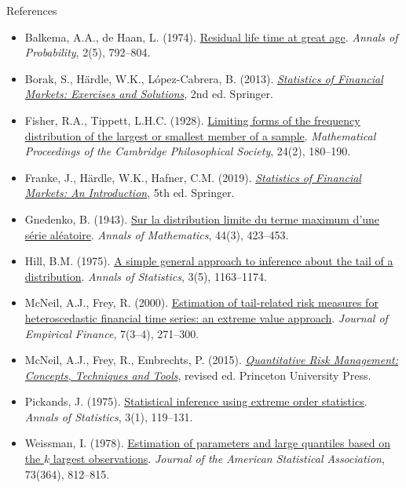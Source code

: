 \begin{frame}{References}
\itemsize{\tiny}
\begin{itemize}
    \item Balkema, A.A., de Haan, L. (1974). \href{https://doi.org/10.1214/aop/1176996548}{Residual life time at great age}. \textit{Annals of Probability}, 2(5), 792--804.
    \item Borak, S., Härdle, W.K., López-Cabrera, B. (2013). \href{https://doi.org/10.1007/978-3-642-33929-5}{\textit{Statistics of Financial Markets: Exercises and Solutions}}, 2nd ed. Springer.
    \item Fisher, R.A., Tippett, L.H.C. (1928). \href{https://doi.org/10.1017/S0305004100015681}{Limiting forms of the frequency distribution of the largest or smallest member of a sample}. \textit{Mathematical Proceedings of the Cambridge Philosophical Society}, 24(2), 180--190.
    \item Franke, J., Härdle, W.K., Hafner, C.M. (2019). \href{https://doi.org/10.1007/978-3-030-13751-9}{\textit{Statistics of Financial Markets: An Introduction}}, 5th ed. Springer.
    \item Gnedenko, B. (1943). \href{https://doi.org/10.2307/1968974}{Sur la distribution limite du terme maximum d'une série aléatoire}. \textit{Annals of Mathematics}, 44(3), 423--453.
    \item Hill, B.M. (1975). \href{https://doi.org/10.1214/aos/1176343247}{A simple general approach to inference about the tail of a distribution}. \textit{Annals of Statistics}, 3(5), 1163--1174.
    \item McNeil, A.J., Frey, R. (2000). \href{https://doi.org/10.1016/S0927-5398(00)00012-8}{Estimation of tail-related risk measures for heteroscedastic financial time series: an extreme value approach}. \textit{Journal of Empirical Finance}, 7(3--4), 271--300.
    \item McNeil, A.J., Frey, R., Embrechts, P. (2015). \href{https://press.princeton.edu/books/hardcover/9780691166278/quantitative-risk-management}{\textit{Quantitative Risk Management: Concepts, Techniques and Tools}}, revised ed. Princeton University Press.
    \item Pickands, J. (1975). \href{https://doi.org/10.1214/aos/1176343003}{Statistical inference using extreme order statistics}. \textit{Annals of Statistics}, 3(1), 119--131.
    \item Weissman, I. (1978). \href{https://doi.org/10.1080/01621459.1978.10480104}{Estimation of parameters and large quantiles based on the $k$ largest observations}. \textit{Journal of the American Statistical Association}, 73(364), 812--815.
\end{itemize}
\end{frame}


